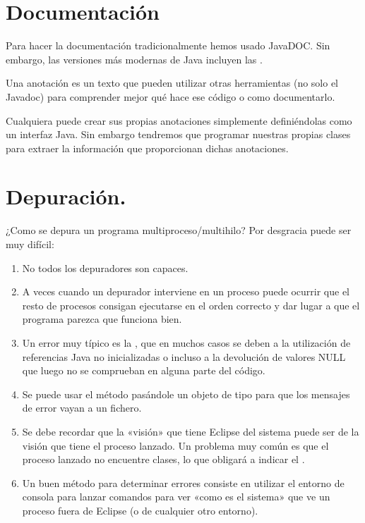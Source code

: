 \documentclass[letterpaper,10pt,spanish]{sphinxmanual}
\begin{document}
\section{Documentación}
\label{\detokenize{textos/tema1:documentacion}}
Para hacer la documentación tradicionalmente hemos usado JavaDOC. Sin embargo, las versiones más modernas de Java incluyen las .

Una anotación es un texto que pueden utilizar otras herramientas (no solo el Javadoc) para comprender mejor qué hace ese código o como documentarlo.

Cualquiera puede crear sus propias anotaciones simplemente definiéndolas como un interfaz Java. Sin embargo tendremos que programar nuestras propias clases para extraer la información que proporcionan dichas anotaciones.


\section{Depuración.}
\label{\detokenize{textos/tema1:depuracion}}
¿Como se depura un programa multiproceso/multihilo? Por desgracia puede ser muy difícil:
\begin{enumerate}
\def\theenumi{\arabic{enumi}}
\def\labelenumi{\theenumi .}
\makeatletter\def\p@enumii{\p@enumi \theenumi .}\makeatother
\item {} 
No todos los depuradores son capaces.

\item {} 
A veces cuando un depurador interviene en un proceso puede ocurrir que el resto de procesos consigan ejecutarse en el orden correcto y dar lugar a que el programa parezca que funciona bien.

\item {} 
Un error muy típico es la , que en muchos casos se deben a la utilización de referencias Java no inicializadas o incluso a la devolución de valores NULL que luego no se comprueban en alguna parte del código.

\item {} 
Se puede usar el método  pasándole un objeto de tipo  para que los mensajes de error vayan a un fichero.

\item {} 
Se debe recordar que la «visión» que tiene Eclipse del sistema puede ser  de la visión que tiene el proceso lanzado. Un problema muy común es que el proceso lanzado no encuentre clases, lo que obligará a indicar el .

\item {} 
Un buen método para determinar errores consiste en utilizar el entorno de consola para lanzar comandos para ver «como es el sistema» que ve un proceso fuera de Eclipse (o de cualquier otro entorno).

\end{enumerate}
\end{document}
